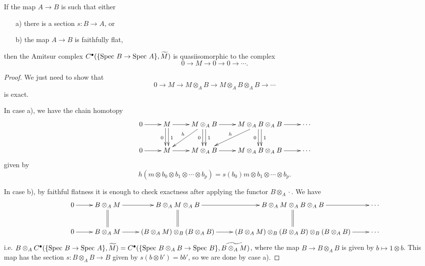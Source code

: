 \begin{lem}\label{fpqc} If the map $A \rightarrow B$ is such that either
\begin{enumerate}
\item[\rm{a)}] there is a section $s : B\rightarrow A$, or

\item[\rm{b)}] the map $A \rightarrow B$ is faithfully flat,
\end{enumerate}
then the Amitsur complex $C^\bullet(\{\mbox{\rm Spec }B\rightarrow\mbox{\rm Spec }A\},\widetilde{M})$ is quasiisomorphic to the complex
\[
0 \rightarrow M \rightarrow 0 \rightarrow 0 \rightarrow \cdots.
\]
\end{lem}
\begin{proof} We just need to show that
\[
0 \rightarrow M \rightarrow M\otimes_AB \rightarrow M\otimes_AB\otimes_AB \rightarrow \cdots
\]
is exact.

In case a), we have the chain homotopy
\begin{align*}
\xymatrix{&0 \ar[r] &M \ar@<-0.5ex>[d]_0 \ar@<0.5ex>[d]^1 \ar[r] &M\otimes_AB \ar@<-0.5ex>[d]_0 \ar@<0.5ex>[d]^1 \ar[dl]_h \ar[r] &M\otimes_AB\otimes_AB \ar@<-0.5ex>[d]_0 \ar@<0.5ex>[d]^1 \ar[dl]_h \ar[r] &\cdots \\
&0 \ar[r] &M \ar[r] &M\otimes_AB \ar[r] &M\otimes_AB\otimes_AB \ar[r] &\cdots}
\end{align*}
given by
\[
h(m\otimes b_0 \otimes b_1\otimes \cdots\otimes b_p) = s(b_0)m\otimes b_1 \otimes \cdots \otimes b_p.
\]

In case b), by faithful flatness it is enough to check exactness after applying the functor $B\otimes_A \cdot$. We have
\begin{align*}
\xymatrix{&0 \ar[r] &B\otimes_AM \ar@{=}[d] \ar[r] &B\otimes_AM\otimes_AB \ar@{=}[d] \ar[r] &B\otimes_AM\otimes_AB\otimes_AB \ar@{=}[d] \ar[r] &\cdots \\
&0 \ar[r] &B\otimes_AM \ar[r] &(B\otimes_AM)\otimes_B(B\otimes_AB) \ar[r] &(B\otimes_AM)\otimes_B(B\otimes_AB)\otimes_B(B\otimes_AB) \ar[r] &\cdots}
\end{align*}
i.e. $B\otimes_A C^\bullet(\{\mbox{\rm Spec }B\rightarrow\mbox{\rm Spec }A\},\widetilde{M}) = C^\bullet(\{\mbox{\rm Spec }B\otimes_AB\rightarrow\mbox{\rm Spec }B\},\widetilde{B\otimes_AM})$, where the map $B \rightarrow B\otimes_AB$ is given by $b \mapsto 1\otimes b$. This map has the section $s:B\otimes_AB \rightarrow B$ given by $s(b\otimes b') = bb'$, so we are done by case a).
\end{proof}

